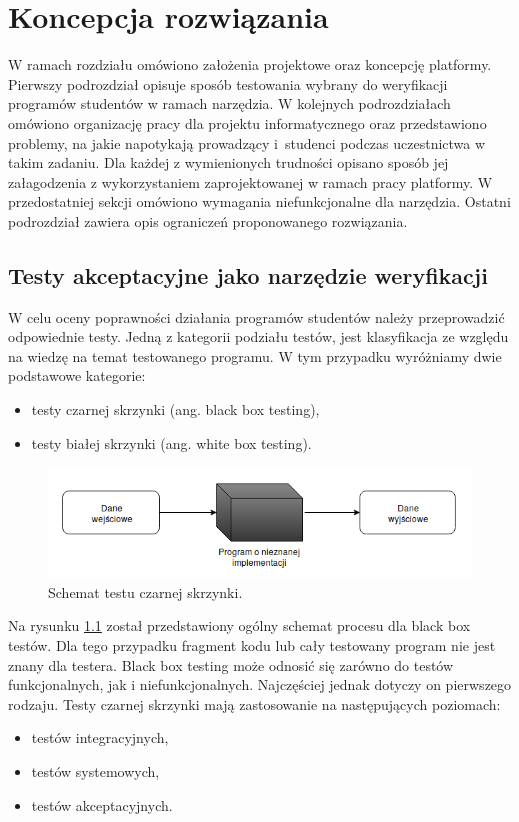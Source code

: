 \chapter{Koncepcja rozwiązania}
\label{chapter:requirements}

W ramach rozdziału omówiono założenia projektowe oraz koncepcję platformy.
Pierwszy podrozdział opisuje sposób testowania wybrany do weryfikacji programów studentów w ramach narzędzia.
W kolejnych podrozdziałach omówiono organizację pracy dla projektu informatycznego oraz przedstawiono problemy, na jakie napotykają prowadzący i~studenci podczas uczestnictwa w takim zadaniu.
Dla każdej z wymienionych trudności opisano sposób jej załagodzenia z wykorzystaniem zaprojektowanej w ramach pracy platformy.
W przedostatniej sekcji omówiono wymagania niefunkcjonalne dla narzędzia.
Ostatni podrozdział zawiera opis ograniczeń proponowanego rozwiązania.

\section{Testy akceptacyjne jako narzędzie weryfikacji}

W celu oceny poprawności działania programów studentów należy przeprowadzić odpowiednie testy.
Jedną z kategorii podziału testów, jest klasyfikacja ze względu na wiedzę na temat testowanego programu.
W tym przypadku wyróżniamy dwie podstawowe kategorie:
\begin{itemize}
    \item testy czarnej skrzynki (ang. black box testing),
    \item testy białej skrzynki (ang. white box testing).
\end{itemize}

\begin{figure}[h]
    \centering
    \includegraphics[width = 13cm]{chapter02/black-box.png}
    \caption{Schemat testu czarnej skrzynki.}
    \label{fig:black-box}
\end{figure}

Na rysunku \ref{fig:black-box} został przedstawiony ogólny schemat procesu dla black box testów.
Dla tego przypadku fragment kodu lub cały testowany program nie jest znany dla testera.
Black box testing może odnosić się zarówno do testów funkcjonalnych, jak i niefunkcjonalnych.
Najczęściej jednak dotyczy on pierwszego rodzaju.
Testy czarnej skrzynki mają zastosowanie na następujących poziomach:
\begin{itemize}
    \item testów integracyjnych,
    \item testów systemowych,
    \item testów akceptacyjnych.
\end{itemize}

